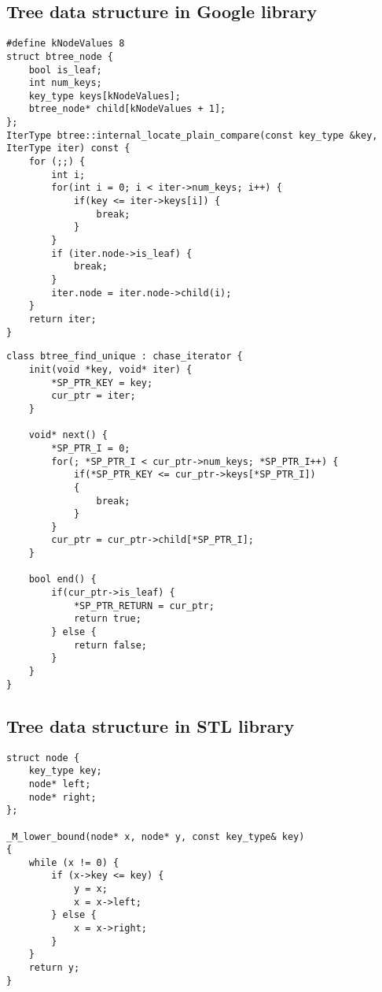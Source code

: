\subsection{Tree data structure in Google library}
\centering
\begin{lstlisting}[caption={Google realization for\\\code{btree::internal\_locate\_plain\_compare()}},label={lst:btree}]
#define kNodeValues 8
struct btree_node {
    bool is_leaf;    
    int num_keys;
    key_type keys[kNodeValues];
    btree_node* child[kNodeValues + 1];
};
IterType btree::internal_locate_plain_compare(const key_type &key, IterType iter) const {
    for (;;) { 
        int i;
        for(int i = 0; i < iter->num_keys; i++) {
            if(key <= iter->keys[i]) {
                break;
            }
        }
        if (iter.node->is_leaf) {
            break;
        }
        iter.node = iter.node->child(i);
    }
    return iter;
}
\end{lstlisting}
\newpage

\begin{lstlisting}[caption={\pulse realization for\\\code{btree::internal\_locate\_plain\_compare()}},label={lst:btree_mod}]
class btree_find_unique : chase_iterator {
    init(void *key, void* iter) {
        *SP_PTR_KEY = key;
        cur_ptr = iter;
    }
  
    void* next() {
        *SP_PTR_I = 0;
        for(; *SP_PTR_I < cur_ptr->num_keys; *SP_PTR_I++) {
            if(*SP_PTR_KEY <= cur_ptr->keys[*SP_PTR_I]) 
            {
                break;
            }
        }
        cur_ptr = cur_ptr->child[*SP_PTR_I];
    }
  
    bool end() {
        if(cur_ptr->is_leaf) {
            *SP_PTR_RETURN = cur_ptr;
            return true;
        } else {
            return false;
        }
    }
}
\end{lstlisting}

\newpage
\subsection{Tree data structure in STL library}
\centering
\begin{lstlisting}[caption={C++ STL realization for \code{map::find()}},label={lst:map}]
struct node {
    key_type key;
    node* left;
    node* right;
};

_M_lower_bound(node* x, node* y, const key_type& key)
{
    while (x != 0) {
        if (x->key <= key) {
            y = x; 
            x = x->left;
        } else {
            x = x->right;
        }
    }
    return y;
}
\end{lstlisting}

